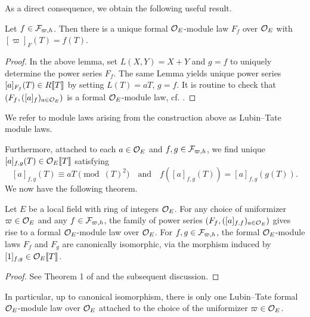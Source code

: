 \documentclass[../main.tex]{subfiles}
\begin{document}
As a direct consequence, we obtain the following useful result.
\begin{lem}
  Let $f \in \mathcal{F}_{\varpi, h}$. Then there is a unique formal ${\mathcal{O}_E}$-module law $F_f$ over ${\mathcal{O}_E}$
  with $[\varpi]_F(T) = f(T)$.
\begin{proof}
  In the above lemma, set $L(X,Y) = X+Y$ and $g=f$ to uniquely determine 
  the power series $F_f$. The same Lemma yields unique power series
  $[a]_{F_f}(T) \in R\llbracket T \rrbracket$ by setting $L(T) = a T$, $g=f$. It is
  routine to check that $(F_f, ([a]_f)_{a \in {\mathcal{O}_E}})$ is a formal ${\mathcal{O}_E}$-module law, 
  cf. \cite{LubinTateFormalMult}.
\end{proof}
\end{lem}

\begin{defi}
  We refer to module laws arising from the construction above as Lubin--Tate module laws.
\end{defi}

Furthermore, attached to each $a \in \mathcal{O}_E$ and $f,g \in \mathcal{F}_{\varpi,h}$, we find
unique $[a]_{f,g}(T) \in \mathcal{O}_E\llbracket T \rrbracket$ satisfying
\begin{equation}\label{eq:LTMoLaScaCond}
  [a]_{f,g}(T) \equiv aT \pmod {(T)^2} \quad \text{and} \quad
  f([a]_{f,g}(T)) = [a]_{f,g}(g(T)).
\end{equation}
We now have the following theorem.
\begin{thm}\label{thm:LTModLaw}
  Let $E$ be a local field with ring of integers $\mathcal{O}_E$. For any choice of 
  uniformizer $\varpi \in \mathcal{O}_E$ and any $f \in \mathcal{F}_{\varpi,h}$, the family of power
  series $(F_f, ([a]_{f,f})_{a \in \mathcal{O}_E})$
  gives rise to a formal $\mathcal{O}_E$-module law over $\mathcal{O}_E$. For 
  $f,g \in \mathcal{F}_{\varpi,h}$, the formal $\mathcal{O}_E$-module laws $F_f$ and $F_g$ are
  canonically isomorphic, via the morphism induced by $[1]_{f,g} \in \mathcal{O}_E\llbracket
  T \rrbracket$. 
\begin{proof}
  See Theorem 1 of \cite{LubinTateFormalMult} and the subsequent discussion.
\end{proof}
\end{thm}
In particular, up to canonical isomorphism, there is only one Lubin--Tate formal
$\mathcal{O}_E$-module law over $\mathcal{O}_E$ attached to the choice of the uniformizer $\varpi \in
\mathcal{O}_E$. 
\end{document}
